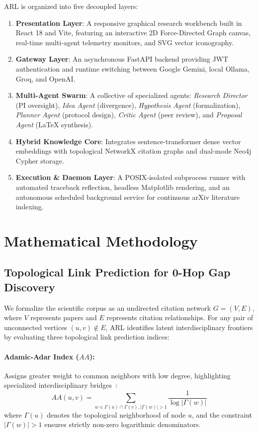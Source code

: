 \documentclass[10pt,twocolumn,letterpaper]{article}
\begin{document}
ARL is organized into five decoupled layers:
\begin{enumerate}
    \item \textbf{Presentation Layer}: A responsive graphical research workbench built in React 18 and Vite, featuring an interactive 2D Force-Directed Graph canvas, real-time multi-agent telemetry monitors, and SVG vector iconography.
    \item \textbf{Gateway Layer}: An asynchronous FastAPI backend providing JWT authentication and runtime switching between Google Gemini, local Ollama, Groq, and OpenAI.
    \item \textbf{Multi-Agent Swarm}: A collective of specialized agents: \textit{Research Director} (PI oversight), \textit{Idea Agent} (divergence), \textit{Hypothesis Agent} (formalization), \textit{Planner Agent} (protocol design), \textit{Critic Agent} (peer review), and \textit{Proposal Agent} (LaTeX synthesis).
    \item \textbf{Hybrid Knowledge Core}: Integrates sentence-transformer dense vector embeddings with topological NetworkX citation graphs and dual-mode Neo4j Cypher storage.
    \item \textbf{Execution \& Daemon Layer}: A POSIX-isolated subprocess runner with automated traceback reflection, headless Matplotlib rendering, and an autonomous scheduled background service for continuous arXiv literature indexing.
\end{enumerate}

\section{Mathematical Methodology}

\subsection{Topological Link Prediction for 0-Hop Gap Discovery}
We formalize the scientific corpus as an undirected citation network $G = (V, E)$, where $V$ represents papers and $E$ represents citation relationships. For any pair of unconnected vertices $(u, v) \notin E$, ARL identifies latent interdisciplinary frontiers by evaluating three topological link prediction indices:

\paragraph{Adamic-Adar Index ($AA$):}
Assigns greater weight to common neighbors with low degree, highlighting specialized interdisciplinary bridges~\cite{adamic2003friends}:
\begin{equation}
AA(u, v) = \sum_{w \in \Gamma(u) \cap \Gamma(v), |\Gamma(w)| > 1} \frac{1}{\log |\Gamma(w)|}
\end{equation}
where $\Gamma(u)$ denotes the topological neighborhood of node $u$, and the constraint $|\Gamma(w)| > 1$ ensures strictly non-zero logarithmic denominators.
\end{document}
